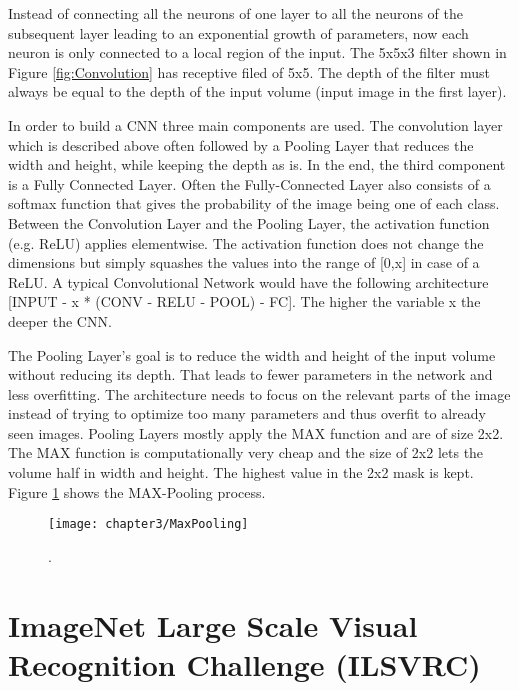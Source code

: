 Instead of connecting all the neurons of one layer to all the neurons of the subsequent layer leading to an exponential growth of parameters, now each neuron is only connected to a local region of the input. The 5x5x3 filter shown in Figure \ref{fig:Convolution} has receptive filed of 5x5. The depth of the filter must always be equal to the depth of the input volume (input image in the first layer).

In order to build a CNN three main components are used. The convolution layer which is described above often followed by a Pooling Layer that reduces the width and height, while keeping the depth as is. In the end, the third component is a Fully Connected Layer. Often the Fully-Connected Layer also consists of a softmax function that gives the probability of the image being one of each class. Between the Convolution Layer and the Pooling Layer, the activation function (e.g. ReLU) applies elementwise. The activation function does not change the dimensions but simply squashes the values into the range of [0,x] in case of a ReLU. A typical Convolutional Network would have the following architecture [INPUT - x * (CONV - RELU - POOL) - FC]. The higher the variable x the deeper the CNN.

The Pooling Layer's goal is to reduce the width and height of the input volume without reducing its depth. That leads to fewer parameters in the network and less overfitting. The architecture needs to focus on the relevant parts of the image instead of trying to optimize too many parameters and thus overfit to already seen images. Pooling Layers mostly apply the MAX function and are of size 2x2. The MAX function is computationally very cheap and the size of 2x2 lets the volume half in width and height. The highest value in the 2x2 mask is kept. Figure \ref{fig:MaxPooling} shows the MAX-Pooling process.

\begin{figure}[H]
  \centering
  \caption{. \cite{cs231convnetworks}}
  \texttt{[image: chapter3/MaxPooling]}
  \label{fig:MaxPooling}
\end{figure}


\section{ImageNet Large Scale Visual Recognition Challenge (ILSVRC)}

